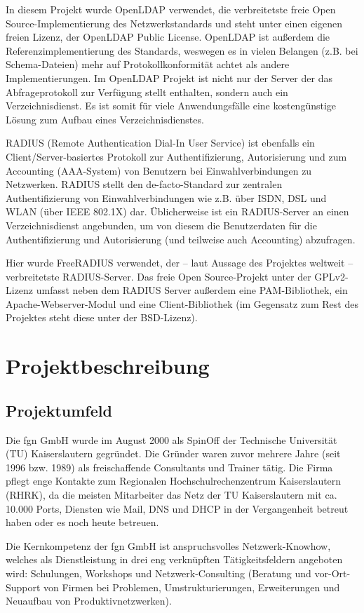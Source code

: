 \documentclass[11pt,a4paper,titlepage=firstiscover,headsepline,bibtotoc]{scrartcl} %
\begin{document}
In diesem Projekt wurde OpenLDAP verwendet, die verbreitetste freie Open Source-Implementierung des Netzwerkstandards und steht unter einen eigenen freien Lizenz, der OpenLDAP Public License. OpenLDAP ist außerdem die Referenzimplementierung des Standards, weswegen es in vielen Belangen (z.B. bei Schema-Dateien) mehr auf Protokollkonformität achtet als andere Implementierungen. Im OpenLDAP Projekt ist nicht nur der Server der das Abfrageprotokoll zur Verfügung stellt enthalten, sondern auch ein Verzeichnisdienst. Es ist somit für viele Anwendungsfälle eine kostengünstige Lösung zum Aufbau eines Verzeichnisdienstes.

RADIUS (Remote Authentication Dial-In User Service) ist ebenfalls ein Client/Server-basiertes Protokoll zur Authentifizierung, Autorisierung und zum Accounting (AAA-System) von Benutzern bei Einwahlverbindungen zu Netzwerken. RADIUS stellt den de-facto-Standard zur zentralen Authentifizierung von Einwahlverbindungen wie z.B. über ISDN, DSL und WLAN (über IEEE 802.1X) dar. Üblicherweise ist ein RADIUS-Server an einen Verzeichnisdienst angebunden, um von diesem die Benutzerdaten für die Authentifizierung und Autorisierung (und teilweise auch Accounting) abzufragen.

Hier wurde FreeRADIUS verwendet, der -- laut Aussage des Projektes weltweit -- verbreitetste RADIUS-Server. Das freie Open Source-Projekt unter der GPLv2-Lizenz umfasst neben dem RADIUS Server außerdem eine PAM-Bibliothek, ein Apache-Webserver-Modul und eine Client-Bibliothek (im Gegensatz zum Rest des Projektes steht diese unter der BSD-Lizenz).

\section{Projektbeschreibung}
\subsection{Projektumfeld}
Die fgn GmbH wurde im August 2000 als SpinOff der Technische Universität (TU) Kaiserslautern gegründet. Die Gründer waren zuvor mehrere Jahre (seit 1996 bzw. 1989) als freischaffende Consultants und Trainer tätig. Die Firma pflegt enge Kontakte zum Regionalen Hochschulrechenzentrum Kaiserslautern (RHRK), da die meisten Mitarbeiter das Netz der TU Kaiserslautern mit ca. 10.000 Ports, Diensten wie Mail, DNS und DHCP in der Vergangenheit betreut haben oder es noch heute betreuen.

Die Kernkompetenz der fgn GmbH ist anspruchsvolles Netzwerk-Knowhow, welches als Dienstleistung in drei eng verknüpften Tätigkeitsfeldern angeboten wird: Schulungen, Workshops und Netzwerk-Consulting (Beratung und vor-Ort-Support von Firmen bei Problemen, Umstrukturierungen, Erweiterungen und Neuaufbau von Produktivnetzwerken).
\end{document}
